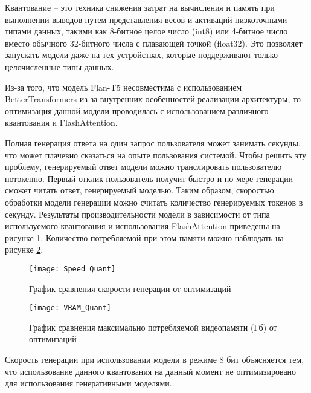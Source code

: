 Квантование -- это техника снижения затрат на вычисления и память при выполнении выводов путем представления весов и активаций низкоточными типами данных, такими как 8-битное целое число (int8) или 4-битное число вместо обычного 32-битного числа с плавающей точкой (float32). Это позволяет запускать модели даже на тех устройствах, которые поддерживают только целочисленные типы данных.

Из-за того, что модель Flan-T5 несовместима с использованием BetterTransformers из-за внутренних особенностей реализации архитектуры, то оптимизация данной модели проводилась с использованием различного квантования и FlashAttention.

Полная генерация ответа на один запрос пользователя может занимать секунды, что может плачевно сказаться на опыте пользования системой. Чтобы решить эту проблему, генерируемый ответ модели можно транслировать пользователю потокенно. Первый отклик пользователь получит быстро и по мере генерации сможет читать ответ, генерируемый моделью. Таким образом, скоростью обработки модели генерации можно считать количество генерируемых токенов в секунду. Результаты производительности модели в зависимости от типа используемого квантования и использования FlashAttention приведены на рисунке \ref{speed-quant}. Количество потребляемой при этом памяти можно наблюдать на рисунке \ref{vram-quant}.

\begin{figure}[H]
    \centering
    \texttt{[image: Speed\_Quant]}
    \caption{График сравнения скорости генерации от оптимизаций}
    \label{speed-quant}
\end{figure}

\begin{figure}[H]
    \centering
    \texttt{[image: VRAM\_Quant]}
    \caption{График сравнения максимально потребляемой видеопамяти (Гб) от оптимизаций}
    \label{vram-quant}
\end{figure}

Скорость генерации при использовании модели в режиме 8 бит объясняется тем, что использование данного квантования на данный момент не оптимизировано для использования генеративными моделями.